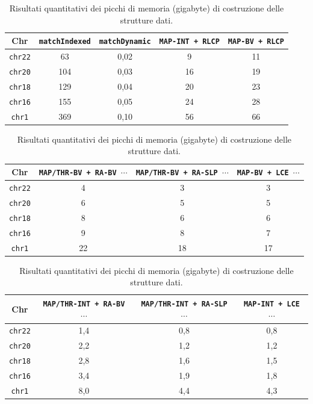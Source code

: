 \begin{table}
  \centering
  \caption{Risultati quantitativi dei picchi di memoria (gigabyte) di
    costruzione delle 
    strutture dati.} 
  \label{tab:exemem}
  \footnotesize
  \begin{tabular}{c||c|c|c|c} 
    \textbf{Chr}
    & \textbf{\texttt{matchIndexed}}
    & \textbf{\texttt{matchDynamic}}
    & \textbf{\texttt{MAP-INT + RLCP}}
    & \textbf{\texttt{MAP-BV + RLCP}}\\
    \hline
    \hline
    \texttt{chr22} & 63 & 0,02 & 9 & 11 \\
    \texttt{chr20} & 104 & 0,03 & 16 & 19 \\
    \texttt{chr18} & 129 & 0,04 & 20 & 23 \\
    \texttt{chr16} & 155 & 0,05 & 24 & 28 \\
    \texttt{chr1} & 369 & 0,10 & 56 & 66 
  \end{tabular}
  \vspace{+3mm}
  \vspace{+1mm}
  \begin{tabular}{c||c|c|c} 
    \textbf{Chr}
    & \textbf{\texttt{MAP/THR-BV + RA-BV $\cdots$}}
    & \textbf{\texttt{MAP/THR-BV + RA-SLP $\cdots$}}
    & \textbf{\texttt{MAP-BV + LCE $\cdots$}}\\
    \hline
    \hline
    \texttt{chr22} & 4 & 3 & 3  \\
    \texttt{chr20} & 6 & 5 & 5 \\
    \texttt{chr18} & 8 & 6 & 6 \\
    \texttt{chr16} & 9 & 8 & 7 \\
    \texttt{chr1} & 22 & 18 & 17 
  \end{tabular}
  \vspace{+3mm}
  \vspace{+1mm}
  \begin{tabular}{c||c|c|c} 
    \textbf{Chr}
    & \textbf{\texttt{MAP/THR-INT + RA-BV $\cdots$}}
    & \textbf{\texttt{MAP/THR-INT + RA-SLP $\cdots$}}
    & \textbf{\texttt{MAP-INT + LCE $\cdots$}}\\
    \hline
    \hline
    \texttt{chr22} & 1,4 & 0,8 & 0,8 \\
    \texttt{chr20} & 2,2 & 1,2 & 1,2 \\
    \texttt{chr18} & 2,8 & 1,6 & 1,5 \\
    \texttt{chr16} & 3,4 & 1,9 & 1,8 \\
    \texttt{chr1} & 8,0 & 4,4 & 4,3                                           
  \end{tabular}
\end{table}
